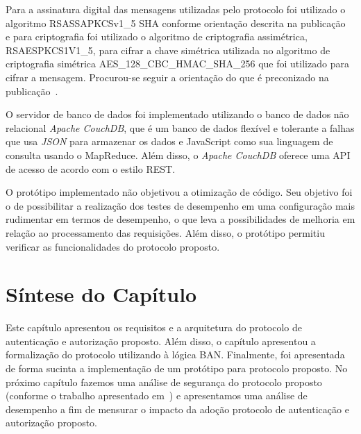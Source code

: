 Para a assinatura digital das mensagens utilizadas pelo protocolo foi utilizado o algoritmo RSASSA\-PKCS\-v1\_5 SHA conforme orientação descrita na publicação~\cite{ietfjws} e para criptografia foi utilizado o algoritmo de criptografia assimétrica, RSAES\-PKCS1\-V1\_5, para cifrar a chave simétrica utilizada no algoritmo de criptografia simétrica AES\_128\_CBC\_HMAC\_SHA\_256 que foi utilizado para cifrar a mensagem. Procurou-se seguir a orientação do que é preconizado na publicação~\cite{jwt2014}.

O servidor de banco de dados foi implementado utilizando o banco de dados não relacional \emph{Apache CouchDB}, que é um banco de dados flexível e tolerante a falhas que usa \emph{JSON} para armazenar os dados e JavaScript como sua linguagem de consulta usando o MapReduce. Além disso, o \emph{Apache CouchDB} oferece uma API de acesso de acordo com o estilo REST.

O protótipo implementado não objetivou a otimização de código. Seu objetivo foi o de possibilitar a realização dos testes de desempenho em uma configuração mais rudimentar em termos de desempenho, o que leva a possibilidades de melhoria em relação ao processamento das requisições. Além disso, o protótipo permitiu verificar as funcionalidades do protocolo proposto.


\section{Síntese do Capítulo}

Este capítulo apresentou os requisitos e a arquitetura do protocolo de autenticação e autorização proposto. Além disso, o capítulo apresentou a formalização do protocolo utilizando à lógica BAN. Finalmente, foi apresentada de forma sucinta a implementação de um protótipo para protocolo proposto. No próximo capítulo fazemos uma análise de segurança do protocolo proposto (conforme o trabalho apresentado em~\cite{traust08}) e apresentamos uma análise de desempenho a fim de mensurar o impacto da adoção protocolo de autenticação e autorização proposto. %